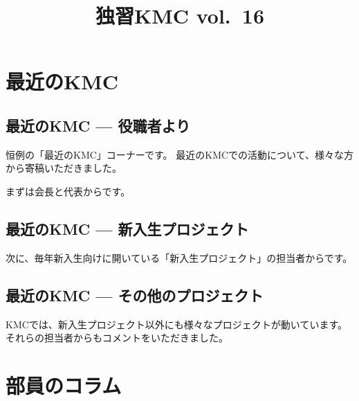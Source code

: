 \documentclass[lualatex,b5paper,openany,pandoc,jbase=12Q,magstyle=nomag*]{luakmcbook}
\title{独習KMC vol.~16}
\date{}
\begin{document}
\maketitle



\tableofcontents

\part{最近のKMC}
\chapter{最近のKMC --- 役職者より}
恒例の「最近のKMC」コーナーです。
最近のKMCでの活動について、様々な方から寄稿いただきました。

まずは会長と代表からです。




\chapter{最近のKMC --- 新入生プロジェクト}
次に、毎年新入生向けに開いている「新入生プロジェクト」の担当者からです。







\chapter{最近のKMC --- その他のプロジェクト}
KMCでは、新入生プロジェクト以外にも様々なプロジェクトが動いています。それらの担当者からもコメントをいただきました。






\part{部員のコラム}


\end{document}
